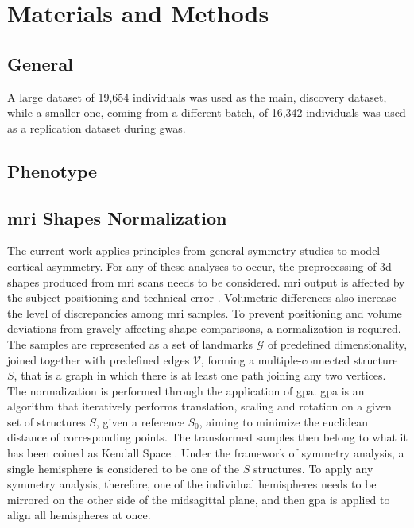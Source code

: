 \chapter{Materials and Methods}\label{chap:mat_and_methods}
\section{General}
A large dataset of 19,654 individuals was used as the main, discovery dataset, while a smaller one, coming from a different batch, of 16,342 individuals was used as a replication dataset during \ac{gwas}.
\section{Phenotype}
\section{\Ac{mri} Shapes Normalization}\label{subsec:shape_normalization}
The current work applies principles from general symmetry studies to model cortical asymmetry. For any of these analyses to occur, the preprocessing of \ac{3d} shapes produced from \ac{mri} scans needs to be considered. \Ac{mri} output is affected by the subject positioning and technical error \cite{Wittens2021}.  Volumetric differences also increase the level of discrepancies among \ac{mri} samples.  To prevent positioning and volume deviations from gravely affecting shape comparisons, a normalization is required\cite{Klingenberg2020}. The samples are represented as a set of landmarks $\mathcal{G}$ of predefined dimensionality, joined together with predefined edges $\mathcal{V}$, forming a multiple-connected structure $S$, that is a graph in which there is at least one path joining any two vertices. The normalization is performed through the application of \ac{gpa}. \Ac{gpa} is an algorithm that iteratively performs translation, scaling and rotation on a given set of structures $S$, given a reference $S_0$, aiming to minimize the euclidean distance of corresponding points. The transformed samples then belong to what it has been coined as Kendall Space \cite{Klingenberg2020}. Under the framework of symmetry analysis, a single hemisphere is considered to be one of the $S$ structures. To apply any symmetry analysis, therefore, one of the individual hemispheres needs to be mirrored on the other side of the midsagittal plane, and then \ac{gpa} is applied to align all hemispheres at once.

